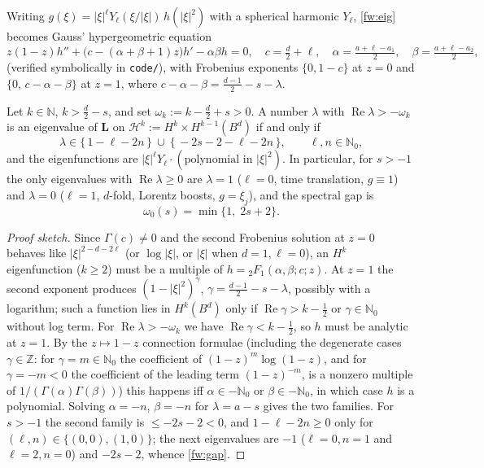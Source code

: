 Writing $g(\xi)=|\xi|^\ell Y_\ell(\xi/|\xi|)\,h(|\xi|^2)$ with a spherical
harmonic $Y_\ell$, \eqref{fw:eig} becomes Gauss' hypergeometric equation
\begin{equation}\label{fw:hyp}
  z(1-z)h''+\big(c-(\alpha+\beta+1)z\big)h'-\alpha\beta h=0,\quad
  c=\tfrac d2+\ell,\quad \alpha=\tfrac{a+\ell-a_1}{2},\quad \beta=\tfrac{a+\ell-a_2}{2},
\end{equation}
(verified symbolically in \texttt{code/}), with Frobenius exponents
$\{0,1-c\}$ at $z=0$ and $\{0,\,c-\alpha-\beta\}$ at $z=1$, where
$c-\alpha-\beta=\frac{d-1}{2}-s-\lambda$.

\begin{theorem}\label{fw:thm-spec}
Let $k\in\mathbb N$, $k>\frac d2-s$, and set $\omega_k:=k-\frac d2+s>0$. A
number $\lambda$ with $\operatorname{Re}\lambda>-\omega_k$ is an eigenvalue
of $\mathbf L$ on $\mathcal H^k:=H^k\times H^{k-1}(B^d)$ if and only if
\[
  \lambda\in\{\,1-\ell-2n\,\}\ \cup\ \{\,-2s-2-\ell-2n\,\},\qquad \ell,n\in\mathbb N_0,
\]
and the eigenfunctions are $|\xi|^\ell Y_\ell\cdot(\text{polynomial in }|\xi|^2)$.
In particular, for $s>-1$ the only eigenvalues with $\operatorname{Re}\lambda\ge0$
are $\lambda=1$ ($\ell=0$, time translation, $g\equiv1$) and $\lambda=0$
($\ell=1$, $d$-fold, Lorentz boosts, $g=\xi_j$), and the spectral gap is
\begin{equation}\label{fw:gap}
  \omega_0(s)=\min\{1,\;2s+2\}.
\end{equation}
\end{theorem}
\begin{proof}[Proof sketch]
Since $\Gamma(c)\neq0$ and the second Frobenius solution at $z=0$ behaves like
$|\xi|^{2-d-2\ell}$ (or $\log|\xi|$, or $|\xi|$ when $d=1,\ell=0$), an
$H^k$ eigenfunction ($k\ge2$) must be a multiple of
$h={}_2F_1(\alpha,\beta;c;z)$. At $z=1$ the second exponent produces
$(1-|\xi|^2)^{\gamma}$, $\gamma=\frac{d-1}{2}-s-\lambda$, possibly with a
logarithm; such a function lies in $H^k(B^d)$ only if
$\operatorname{Re}\gamma>k-\frac12$ or $\gamma\in\mathbb N_0$ without log term.
For $\operatorname{Re}\lambda>-\omega_k$ we have $\operatorname{Re}\gamma<k-\frac12$,
so $h$ must be analytic at $z=1$. By the $z\mapsto1-z$ connection formulae \cite[\S15.8]{DLMF} (including the
degenerate cases $\gamma\in\mathbb Z$: for $\gamma=m\in\mathbb N_0$ the coefficient of
$(1-z)^m\log(1-z)$, and for $\gamma=-m<0$ the coefficient of the leading term
$(1-z)^{-m}$, is a nonzero multiple of $1/(\Gamma(\alpha)\Gamma(\beta))$)
this happens iff $\alpha\in-\mathbb N_0$ or $\beta\in-\mathbb N_0$, in which case $h$ is a
polynomial. Solving $\alpha=-n$, $\beta=-n$ for $\lambda=a-s$ gives the two
families. For $s>-1$ the second family is $\le -2s-2<0$, and $1-\ell-2n\ge0$
only for $(\ell,n)\in\{(0,0),(1,0)\}$; the next eigenvalues are $-1$
($\ell=0,n=1$ and $\ell=2,n=0$) and $-2s-2$, whence \eqref{fw:gap}.
\end{proof}


